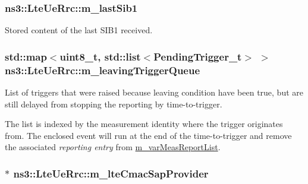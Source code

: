 \subsubsection[{\texorpdfstring{m\+\_\+last\+Sib1}{m_lastSib1}}]{ ns3\+::\+Lte\+Ue\+Rrc\+::m\+\_\+last\+Sib1\hspace{0.3cm}{\ttfamily [private]}}\hypertarget{classns3_1_1LteUeRrc_ad9ca8247270fbed524a86dff9bfd4999}{}\label{classns3_1_1LteUeRrc_ad9ca8247270fbed524a86dff9bfd4999}


Stored content of the last S\+I\+B1 received. 

\subsubsection[{\texorpdfstring{m\+\_\+leaving\+Trigger\+Queue}{m_leavingTriggerQueue}}]{\setlength{\rightskip}{0pt plus 5cm}std\+::map$<$uint8\+\_\+t, {\bf std\+::list}$<${\bf Pending\+Trigger\+\_\+t}$>$ $>$ ns3\+::\+Lte\+Ue\+Rrc\+::m\+\_\+leaving\+Trigger\+Queue\hspace{0.3cm}{\ttfamily [private]}}\hypertarget{classns3_1_1LteUeRrc_a7984d05cbcc51cd9239a22bd7e400d06}{}\label{classns3_1_1LteUeRrc_a7984d05cbcc51cd9239a22bd7e400d06}


List of triggers that were raised because leaving condition have been true, but are still delayed from stopping the reporting by time-\/to-\/trigger. 

The list is indexed by the measurement identity where the trigger originates from. The enclosed event will run at the end of the time-\/to-\/trigger and remove the associated {\itshape reporting entry} from \hyperlink{classns3_1_1LteUeRrc_a82da3c138c967761910c02b83724a0e4}{m\+\_\+var\+Meas\+Report\+List}. 
\subsubsection[{\texorpdfstring{m\+\_\+lte\+Cmac\+Sap\+Provider}{m_lteCmacSapProvider}}]{$\ast$ ns3\+::\+Lte\+Ue\+Rrc\+::m\+\_\+lte\+Cmac\+Sap\+Provider\hspace{0.3cm}{\ttfamily [private]}}\hypertarget{classns3_1_1LteUeRrc_acc0eaf7cf5a1ec8706f57b8164fcad4f}{}\label{classns3_1_1LteUeRrc_acc0eaf7cf5a1ec8706f57b8164fcad4f}

